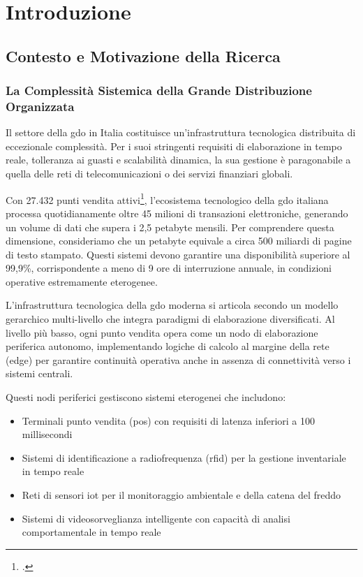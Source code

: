 \chapter{\texorpdfstring{Introduzione}{Capitolo 1 - Introduzione}}
\label{cap:introduzione}

\section{\texorpdfstring{Contesto e Motivazione della Ricerca}{1.1 - Contesto e Motivazione della Ricerca}}
\label{sec:contesto_motivazione}

\subsection{\texorpdfstring{La Complessità Sistemica della Grande Distribuzione Organizzata}{1.1.1 - La Complessità Sistemica della Grande Distribuzione Organizzata}}
\label{subsec:complessita_sistemica}

Il settore della \gls{gdo} in Italia costituisce un'infrastruttura tecnologica distribuita di eccezionale complessità. Per i suoi stringenti requisiti di elaborazione in tempo reale, tolleranza ai guasti e scalabilità dinamica, la sua gestione è paragonabile a quella delle reti di telecomunicazioni o dei servizi finanziari globali.

Con 27.432 punti vendita attivi\footcite{istat2024}, l'ecosistema tecnologico della \gls{gdo} italiana processa quotidianamente oltre 45 milioni di transazioni elettroniche, generando un volume di dati che supera i 2,5 petabyte mensili. Per comprendere questa dimensione, consideriamo che un petabyte equivale a circa 500 miliardi di pagine di testo stampato. Questi sistemi devono garantire una disponibilità superiore al 99,9\%, corrispondente a meno di 9 ore di interruzione annuale, in condizioni operative estremamente eterogenee.

L'infrastruttura tecnologica della \gls{gdo} moderna si articola secondo un modello gerarchico multi-livello che integra paradigmi di elaborazione diversificati. Al livello più basso, ogni punto vendita opera come un nodo di elaborazione periferica autonomo, implementando logiche di calcolo al margine della rete (\gls{edge}) per garantire continuità operativa anche in assenza di connettività verso i sistemi centrali. 

Questi nodi periferici gestiscono sistemi eterogenei che includono:
\begin{itemize}
\item Terminali punto vendita (\gls{pos}) con requisiti di latenza inferiori a 100 millisecondi
\item Sistemi di identificazione a radiofrequenza (\gls{rfid}) per la gestione inventariale in tempo reale
\item Reti di sensori \gls{iot} per il monitoraggio ambientale e della catena del freddo
\item Sistemi di videosorveglianza intelligente con capacità di analisi comportamentale in tempo reale
\end{itemize}


